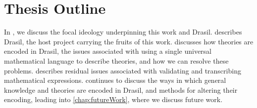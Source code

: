 \section{Thesis Outline}
\label{sec:intro:outline}

In , we discuss the focal ideology underpinning this work
and Drasil.  describes Drasil, the host project carrying the
fruits of this work.  discusses how theories are encoded
in Drasil, the issues associated with using a single universal mathematical
language to describe theories, and how we can resolve these problems.
 describes residual issues associated with validating and
transcribing mathematical expressions.  continues to
discuss the ways in which general knowledge and theories are encoded in Drasil,
and methods for altering their encoding, leading into \cref{chap:futureWork},
where we discuss future work.
